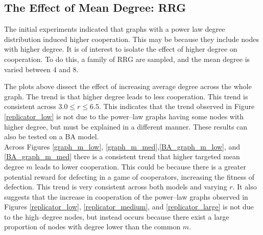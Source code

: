 \subsection{The Effect of Mean Degree: RRG}
The initial experiments indicated that graphs with a power law degree distribution induced higher cooperation. This may be because they include nodes with higher degree. It is of interest to isolate the effect of higher degree on cooperation. To do this, a family of RRG are sampled, and the mean degree is varied between 4 and 8. \\


 \FloatBarrier

 \FloatBarrier

The plots above dissect the effect of increasing average degree across the whole graph. The trend is that higher degree leads to less cooperation. This trend is consistent across $3.0\leq r\leq6.5$. This indicates that the trend observed in Figure \ref{replicator_low} is not due to the power--law graphs having some nodes with higher degree, but must be explained in a different manner. These results can also be tested on a BA model. \\
\FloatBarrier
{}
\FloatBarrier
{}
\FloatBarrier
Across Figures \ref{graph_m_low}, \ref{graph_m_med},\ref{BA_graph_m_low}, and \ref{BA_graph_m_med} there is a consistent trend that higher targeted mean degree $m$ leads to lower cooperation. This could be because there is a greater potential reward for defecting in a game of cooperators, increasing the fitness of defection. This trend is very consistent across both models and varying $r$. It also suggests that the increase in cooperation of the power--law graphs observed in Figures \ref{replicator_low}, \ref{replicator_medium}, and \ref{replicator_large} is not due to the high--degree nodes, but instead occurs because there exist a large proportion of nodes with degree lower than the common $m$.  \\

